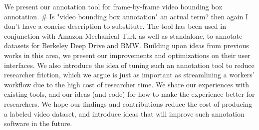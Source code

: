 We present our annotation tool for frame-by-frame video bounding box annotation. # Is "video bounding box annotation" an actual term? then again I don't have a concise description to substitute.
The tool has been used in conjunction with Amazon Mechanical Turk as well as standalone, to annotate datasets for Berkeley Deep Drive and BMW.
Building upon ideas from previous works in this area, we present our improvements and optimizations on their user interfaces.
We also introduce the idea of tuning such an annotation tool to reduce researcher friction, which we argue is just as important as streamlining a workers' workflow due to the high cost of researcher time.
We share our experiences with existing tools, and our ideas (and code) for how to make the experience better for researchers.
We hope our findings and contributions reduce the cost of producing a labeled video dataset, and introduce ideas that will improve such annotation software in the future.
